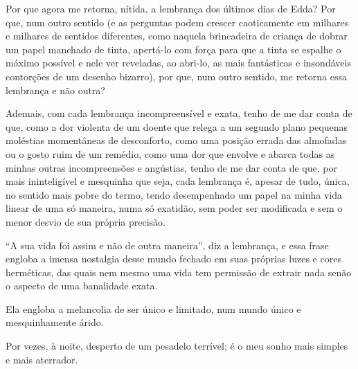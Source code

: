 
Por que agora me retorna, nítida, a lembrança dos últimos dias de Edda? Por que, num outro sentido (e as perguntas podem crescer caoticamente em milhares e milhares de sentidos diferentes, como naquela brincadeira de criança de dobrar um papel manchado de tinta, apertá-lo com força para que a tinta se espalhe o máximo possível e nele ver reveladas, ao abri-lo, as mais fantásticas e insondáveis contorções de um desenho bizarro), por que, num outro sentido, me retorna essa lembrança e não outra?

Ademais, com cada lembrança incompreensível e exata, tenho de me dar conta de que, como a dor violenta de um doente que relega a um segundo plano pequenas moléstias momentâneas de desconforto, como uma posição errada das almofadas ou o gosto ruim de um remédio, como uma dor que envolve e abarca todas as minhas outras incompreensões e angústias, tenho de me dar conta de que, por mais ininteligível e mesquinha que seja, cada lembrança é, apesar de tudo, única, no sentido mais pobre do termo, tendo desempenhado um papel na minha vida linear de uma só maneira, numa só exatidão, sem poder ser modificada e sem o menor desvio de sua própria precisão.

``A sua vida foi assim e não de outra maneira'', diz a lembrança, e essa frase engloba a imensa nostalgia desse mundo fechado em suas próprias luzes e cores herméticas, das quais nem mesmo uma vida tem permissão de extrair nada senão o aspecto de uma banalidade exata.

Ela engloba a melancolia de ser único e limitado, num mundo único e mesquinhamente árido.

Por vezes, à noite, desperto de um pesadelo terrível; é o meu sonho mais simples e mais aterrador.


